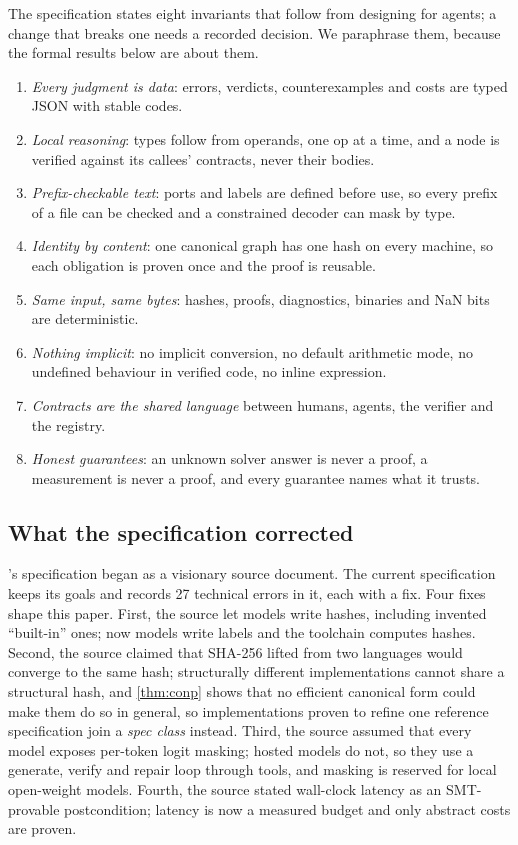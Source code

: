 The specification states eight invariants that follow from designing for agents; a change
that breaks one needs a recorded decision. We paraphrase them, because the formal results
below are about them.
\begin{enumerate}[label=(I\arabic*)]
\item \emph{Every judgment is data}: errors, verdicts, counterexamples and costs are typed
  JSON with stable codes.
\item \emph{Local reasoning}: types follow from operands, one op at a time, and a node is
  verified against its callees' contracts, never their bodies.
\item \emph{Prefix-checkable text}: ports and labels are defined before use, so every prefix
  of a file can be checked and a constrained decoder can mask by type.
\item \emph{Identity by content}: one canonical graph has one hash on every machine, so each
  obligation is proven once and the proof is reusable.
\item \emph{Same input, same bytes}: hashes, proofs, diagnostics, binaries and NaN bits are
  deterministic.
\item \emph{Nothing implicit}: no implicit conversion, no default arithmetic mode, no undefined
  behaviour in verified code, no inline expression.
\item \emph{Contracts are the shared language} between humans, agents, the verifier and the
  registry.
\item \emph{Honest guarantees}: an unknown solver answer is never a proof, a measurement is
  never a proof, and every guarantee names what it trusts.
\end{enumerate}

\subsection{What the specification corrected}

\VG{}'s specification began as a visionary source document. The current specification keeps
its goals and records 27 technical errors in it, each with a fix. Four fixes shape this paper.
First, the source let models write hashes, including invented ``built-in'' ones; now models
write labels and the toolchain computes hashes. Second, the source claimed that SHA-256 lifted
from two languages would converge to the same hash; structurally different implementations
cannot share a structural hash, and \cref{thm:conp} shows that no efficient canonical form
could make them do so in general, so implementations proven to refine one reference
specification join a \emph{spec class} instead. Third, the source assumed that every model
exposes per-token logit masking; hosted models do not, so they use a generate, verify and
repair loop through tools, and masking is reserved for local open-weight models. Fourth, the
source stated wall-clock latency as an SMT-provable postcondition; latency is now a measured
budget and only abstract costs are proven.
